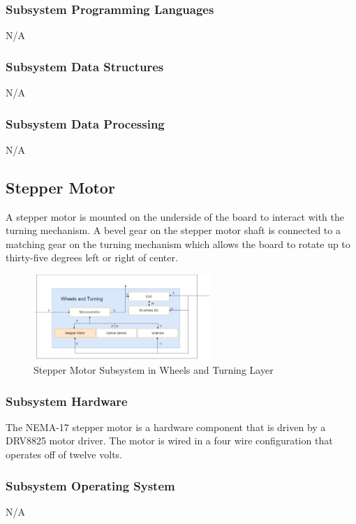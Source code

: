 \subsubsection{Subsystem Programming Languages}
N/A

\subsubsection{Subsystem Data Structures}
N/A

\subsubsection{Subsystem Data Processing}
N/A

\subsection{Stepper Motor}
A stepper motor is mounted on the underside of the board to interact with the turning mechanism. A bevel gear on the stepper motor shaft is connected to a matching gear on the turning mechanism which allows the board to rotate up to thirty-five degrees left or right of center.

\begin{figure}[h!]
	\centering
 	\includegraphics[width=0.60\textwidth]{images/Keaton/Stepper.png}
 \caption{Stepper Motor Subsystem in Wheels and Turning Layer}
\end{figure}

\subsubsection{Subsystem Hardware}
The NEMA-17 stepper motor is a hardware component that is driven by a DRV8825 motor driver. The motor is wired in a four wire configuration that operates off of twelve volts.

\subsubsection{Subsystem Operating System}
N/A

